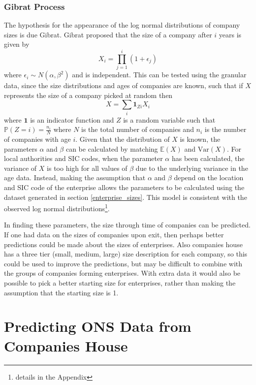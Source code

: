 \documentclass[a4paper,10pt]{article}
\begin{document}
\subsubsection{Gibrat Process}
The hypothesis for the appearance of the log normal distributions of company sizes is due Gibrat. Gibrat proposed that the size of a company after $i$ years is given by
\begin{equation}
 X_i = \prod_{j=1}^{i}(1 + \epsilon_j)
 \label{company_size}
\end{equation}
where $\epsilon_i \sim N(\alpha, \beta^2)$ and is independent. This can be tested using the granular data, since the size distributions and ages of companies are known, such that if $X$ represents the size of a company picked at random then
\begin{equation}
 X = \sum_{i}\mathbf{1}_{Zi}X_i
 \label{overall_dist}
\end{equation}
where $\mathbf{1}$ is an indicator function and $Z$ is a random variable such that $\mathbb{P}(Z = i) = \frac{n_i}{N}$ where $N$ is the total number of companies and $n_i$ is the number of companies with age $i$. Given that the distribution of $X$ is known, the parameters $\alpha$ and $\beta$ can be calculated by matching $\mathbb{E}(X)$ and $\mathrm{Var}(X)$. For local authorities and SIC codes, when the parameter $\alpha$ has been calculated, the variance of $X$ is too high for all values of $\beta$ due to the underlying variance in the age data. Instead, making the assumption that $\alpha$ and $\beta$ depend on the location and SIC code of the enterprise allows the parameters to be calculated using the dataset generated in section \ref{enterprise_sizes}. This model is consistent with the observed log normal distributions\footnote{details in the Appendix}. 

In finding these parameters, the size through time of companies can be predicted. If one had data on the sizes of companies upon exit, then perhaps better predictions could be made about the sizes of enterprises. Also companies house has a three tier (small, medium, large) size description for each company, so this could be used to improve the predictions, but may be difficult to combine with the groups of companies forming enterprises. With extra data it would also be possible to pick a better starting size for enterprises, rather than making the assumption that the starting size is 1.

\section{Predicting ONS Data from Companies House}
\end{document}
